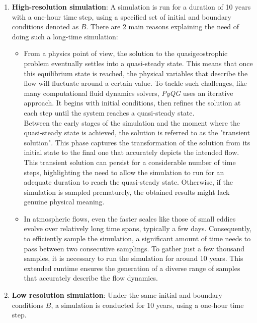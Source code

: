 \begin{enumerate}
	\item \textbf{High-resolution simulation}: A simulation is run for a duration of 10 years with a one-hour time step, using a specified set of initial and boundary conditions denoted as $B$. There are 2 main reasons explaining the need of doing such a long-time simulation:
	
	\begin{itemize}
		\item From a physics point of view, the solution to the quasigeostrophic problem eventually settles into a quasi-steady state. This means that once this equilibrium state is reached, the physical variables that describe the flow will fluctuate around a certain value. To tackle such challenges, like many computational fluid dynamics solvers, \textit{PyQG} uses an iterative approach. It begins with initial conditions, then refines the solution at each step until the system reaches a quasi-steady state.\\

Between the early stages of the simulation and the moment where the quasi-steady state is achieved, the solution is referred to as the "transient solution". This phase captures the transformation of the solution from its initial state to the final one that accurately depicts the intended flow. This transient solution can persist for a considerable number of time steps, highlighting the need to allow the simulation to run for an adequate duration to reach the quasi-steady state. Otherwise, if the simulation is sampled prematurely, the obtained results might lack genuine physical meaning.
		
		\item In atmospheric flows, even the faster scales like those of small eddies evolve over relatively long time spans, typically a few days. Consequently, to efficiently sample the simulation, a significant amount of time needs to pass between two consecutive samplings. To gather just a few thousand samples, it is necessary to run the simulation for around 10 years. This extended runtime ensures the generation of a diverse range of samples that accurately describe the flow dynamics.
	\end{itemize}
	
	\vspace{0.5em}	
	
	\item\textbf{Low resolution simulation}: Under the same initial and boundary conditions $B$, a simulation is conducted for 10 years, using a one-hour time step.
	

\end{enumerate}
